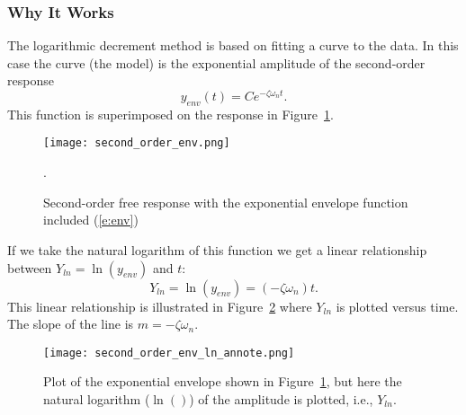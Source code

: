 
\subsubsection{Why It Works}
The logarithmic decrement method is based on fitting a curve to the data.  In this case the curve (the model) is the exponential amplitude of the second-order response
\begin{equation}
y_{env}(t)=C e^{-\zeta\omega_nt}.
\label{e:env}
\end{equation}
This function is superimposed on the response in Figure~\ref{f:env}.
\begin{figure}[h!bt]
\centerline{
{\texttt{[image: second\_order\_env.png]}}}
\caption{Second-order free response with the exponential envelope function included (\ref{e:env})}.
\label{f:env}
\end{figure}

If we take the natural logarithm of this function we get a linear relationship between $Y_{ln}=\ln(y_{env})$ and $t$:
\[
Y_{ln}=\ln(y_{env})=(-\zeta \omega_n) t.
\]
This linear relationship is illustrated in Figure~\ref{f:ln} where $Y_{ln}$ is plotted versus time.  The slope of the line is $m=-\zeta \omega_n$.
\begin{figure}[hbt!]
\centerline{
{\texttt{[image: second\_order\_env\_ln\_annote.png]}}}
\caption{Plot of the exponential envelope shown in Figure~\ref{f:env}, but here the natural logarithm ($\ln()$) of the amplitude is plotted, i.e., $Y_{ln}$.}
\label{f:ln}
\end{figure}


